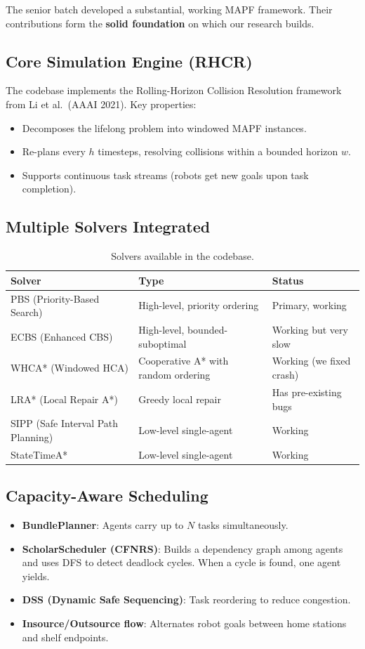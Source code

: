 \documentclass[12pt, a4paper]{article}
\begin{document}
The senior batch developed a substantial, working MAPF framework. Their contributions form the \textbf{solid foundation} on which our research builds.

\subsection{Core Simulation Engine (RHCR)}
The codebase implements the Rolling-Horizon Collision Resolution framework from Li et al.\ (AAAI 2021). Key properties:
\begin{itemize}
    \item Decomposes the lifelong problem into windowed MAPF instances.
    \item Re-plans every $h$ timesteps, resolving collisions within a bounded horizon $w$.
    \item Supports continuous task streams (robots get new goals upon task completion).
\end{itemize}

\subsection{Multiple Solvers Integrated}
\begin{table}[H]
\centering
\begin{tabular}{@{}lll@{}}
\toprule
\textbf{Solver} & \textbf{Type} & \textbf{Status} \\
\midrule
PBS (Priority-Based Search) & High-level, priority ordering & Primary, working \\
ECBS (Enhanced CBS) & High-level, bounded-suboptimal & Working but very slow \\
WHCA* (Windowed HCA) & Cooperative A* with random ordering & Working (we fixed crash) \\
LRA* (Local Repair A*) & Greedy local repair & Has pre-existing bugs \\
SIPP (Safe Interval Path Planning) & Low-level single-agent & Working \\
StateTimeA* & Low-level single-agent & Working \\
\bottomrule
\end{tabular}
\caption{Solvers available in the codebase.}
\end{table}

\subsection{Capacity-Aware Scheduling}
\begin{itemize}
    \item \textbf{BundlePlanner}: Agents carry up to $N$ tasks simultaneously.
    \item \textbf{ScholarScheduler (CFNRS)}: Builds a dependency graph among agents and uses DFS to detect deadlock cycles. When a cycle is found, one agent yields.
    \item \textbf{DSS (Dynamic Safe Sequencing)}: Task reordering to reduce congestion.
    \item \textbf{Insource/Outsource flow}: Alternates robot goals between home stations and shelf endpoints.
\end{itemize}
\end{document}
